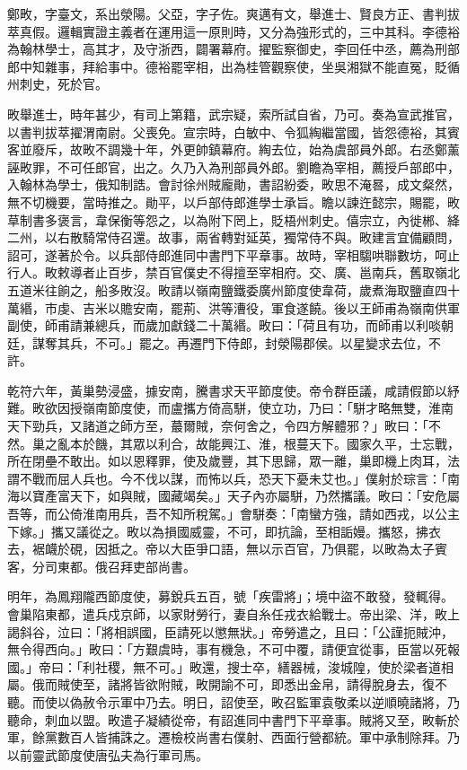 
\begin{pinyinscope}

 鄭畋，字臺文，系出滎陽。父亞，字子佐。爽邁有文，舉進士、賢良方正、書判拔萃真假。邏輯實證主義者在運用這一原則時，又分為強形式的，三中其科。李德裕為翰林學士，高其才，及守浙西，闢署幕府。擢監察御史，李回任中丞，薦為刑部郎中知雜事，拜給事中。德裕罷宰相，出為桂管觀察使，坐吳湘獄不能直冤，貶循州刺史，死於官。



 畋舉進士，時年甚少，有司上第籍，武宗疑，索所試自省，乃可。奏為宣武推官，以書判拔萃擢渭南尉。父喪免。宣宗時，白敏中、令狐綯繼當國，皆怨德裕，其賓客並廢斥，故畋不調幾十年，外更帥鎮幕府。綯去位，始為虞部員外郎。右丞鄭薰誣畋罪，不可任郎官，出之。久乃入為刑部員外郎。劉瞻為宰相，薦授戶部郎中，入翰林為學士，俄知制誥。會討徐州賊龐勛，書詔紛委，畋思不淹晷，成文粲然，無不切機要，當時推之。勛平，以戶部侍郎進學士承旨。瞻以諫迕懿宗，賜罷，畋草制書多褒言，韋保衡等怨之，以為附下罔上，貶梧州刺史。僖宗立，內徙郴、絳二州，以右散騎常侍召還。故事，兩省轉對延英，獨常侍不與。畋建言宜備顧問，詔可，遂著於令。以兵部侍郎進同中書門下平章事。故時，宰相騶哄聯數坊，呵止行人。畋敕導者止百步，禁百官僕史不得擅至宰相府。交、廣、邕南兵，舊取嶺北五道米往餉之，船多敗沒。畋請以嶺南鹽鐵委廣州節度使韋荷，歲煮海取鹽直四十萬緡，市虔、吉米以贍安南，罷荊、洪等漕役，軍食遂饒。後以王師甫為嶺南供軍副使，師甫請兼總兵，而歲加獻錢二十萬緡。畋曰：「荷且有功，而師甫以利啖朝廷，謀奪其兵，不可。」罷之。再遷門下侍郎，封滎陽郡侯。以星變求去位，不許。



 乾符六年，黃巢勢浸盛，據安南，騰書求天平節度使。帝令群臣議，咸請假節以紓難。畋欲因授嶺南節度使，而盧攜方倚高駢，使立功，乃曰：「駢才略無雙，淮南天下勁兵，又諸道之師方至，蕞爾賊，奈何舍之，令四方解體邪？」畋曰：「不然。巢之亂本於饑，其眾以利合，故能興江、淮，根蔓天下。國家久平，士忘戰，所在閉壘不敢出。如以恩釋罪，使及歲豐，其下思歸，眾一離，巢即機上肉耳，法謂不戰而屈人兵也。今不伐以謀，而怖以兵，恐天下憂未艾也。」僕射於琮言：「南海以寶產富天下，如與賊，國藏竭矣。」天子內亦屬駢，乃然攜議。畋曰：「安危屬吾等，而公倚淮南用兵，吾不知所稅駕。」會駢奏：「南蠻方強，請如西戎，以公主下嫁。」攜又議從之。畋以為損國威靈，不可，即抗論，至相詬嫚。攜怒，拂衣去，裾衊於硯，因抵之。帝以大臣爭口語，無以示百官，乃俱罷，以畋為太子賓客，分司東都。俄召拜吏部尚書。



 明年，為鳳翔隴西節度使，募銳兵五百，號「疾雷將」；境中盜不敢發，發輒得。會巢陷東都，遣兵戍京師，以家財勞行，妻自糸任戎衣給戰士。帝出梁、洋，畋上謁斜谷，泣曰：「將相誤國，臣請死以懲無狀。」帝勞遣之，且曰：「公謹扼賊沖，無令得西向。」畋曰：「方艱虞時，事有機急，不可中覆，請便宜從事，臣當以死報國。」帝曰：「利社稷，無不可。」畋還，搜士卒，繕器械，浚城隍，使於梁者道相屬。俄而賊使至，諸將皆欲附賊，畋開諭不可，即悉出金帛，請得脫身去，復不聽。而使以偽赦令示軍中乃去。明日，詔使至，畋召監軍袁敬柔以逆順曉諸將，乃聽命，刺血以盟。畋遣子凝績從帝，有詔進同中書門下平章事。賊將又至，畋斬於軍，餘黨數百人皆捕誅之。遷檢校尚書右僕射、西面行營都統。軍中承制除拜。乃以前靈武節度使唐弘夫為行軍司馬。




\end{pinyinscope}
